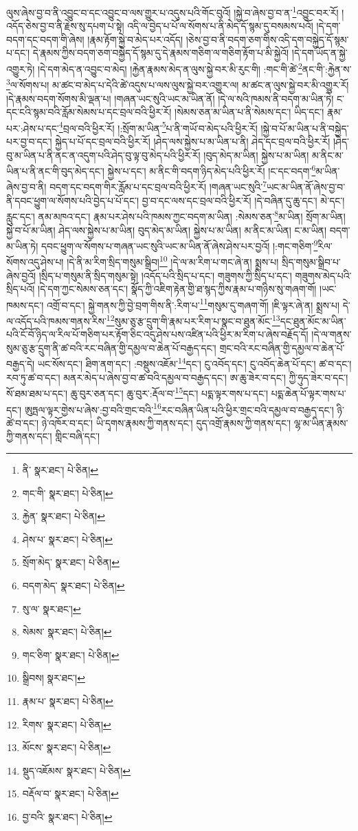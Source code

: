 ལུས་ཞེས་བྱ་བ་ནི་འབྱུང་བ་དང་འབྱུང་བ་ལས་གྱུར་པ་འདུས་པའི་གོང་བུའོ། །སྐྱེ་བ་ཞེས་བྱ་བ་ན་\footnote{ནི་  སྣར་ཐང་།  པེ་ཅིན། }འབྱུང་བར་རོ། །འདོད་ཅེས་བྱ་བ་ནི་རྗེས་སུ་དཔག་པ་སྟེ། འདི་ལ་བྱེད་པ་པོ་ལ་སོགས་པ་ནི་མེད་དོ་སྙམ་དུ་བསམས་པའོ། །དེ་དག་བདག་དང་བདག་གི་ཞེས། །རྣམ་རྟོག་སྐྱེ་བ་མེད་པར་འདོད། །ཅེས་བྱ་བ་ནི་བདག་ཅག་གིས་འདི་དག་བསྐྱེད་དོ་སྙམ་པ་དང་། དེ་རྣམས་ཀྱིས་བདག་ཅག་བསྐྱེད་དོ་སྙམ་དུ་དེ་རྣམས་གཅིག་ལ་གཅིག་རྟོག་པ་མི་སྐྱེའོ། །དེ་དག་ཡོད་ན་སྐྱེ་འགྱུར་ཏེ། །དེ་དག་མེད་ན་འབྱུང་བ་མེད། །རྐྱེན་རྣམས་མེད་ན་ལུས་སྐྱེ་བར་མི་རུང་གི། :གང་གི་ཚེ་\footnote{གང་གི་  སྣར་ཐང་།  པེ་ཅིན། }ནང་གི་:རྐྱེན་ས་\footnote{རྐྱེན་  སྣར་ཐང་།  པེ་ཅིན། }ལ་སོགས་པ། མ་ཚང་བ་མེད་པ་དེའི་ཚེ་འདུས་པ་ལས་ལུས་སྐྱེ་བར་འགྱུར་ལ། མ་ཚང་ན་ལུས་སྐྱེ་བར་མི་འགྱུར་རོ། །དེ་རྣམས་བདག་སོགས་མི་ལྡན་པ། །གཞན་ཡང་སུའི་ཡང་མ་ཡིན་ནོ། །དེ་ལ་སའི་ཁམས་ནི་བདག་མ་ཡིན་ཏེ། ང་དང་ངའི་སྙམ་བའི་རློམ་སེམས་པ་དང་བྲལ་བའི་ཕྱིར་རོ། །སེམས་ཅན་མ་ཡིན་པ་ནི་སེམས་དང་། ཡིད་དང་། རྣམ་པར་:ཤེས་པ་དང་\footnote{ཤེས་པ་  སྣར་ཐང་།  པེ་ཅིན། }བྲལ་བའི་ཕྱིར་རོ། །:སྲོག་མ་ཡིན་\footnote{སྲོག་མེད་  སྣར་ཐང་།  པེ་ཅིན། }པ་ནི་གཡོ་བ་མེད་པའི་ཕྱིར་རོ། །སྐྱེ་བ་པོ་མ་ཡིན་པ་ནི་བསྐྱེད་པར་བྱ་བ་དང་། སྐྱེད་པ་པོ་དང་བྲལ་བའི་ཕྱིར་རོ། །ཤེད་ལས་སྐྱེས་པ་མ་ཡིན་པ་ནི། ཤེད་དང་བྲལ་བའི་ཕྱིར་རོ། །ཤེད་བུ་མ་ཡིན་པ་ནི་ནང་ན་འདུག་པའི་ཤེད་བུ་ལྟ་བུ་མེད་པའི་ཕྱིར་རོ། །བུད་མེད་མ་ཡིན། སྐྱེས་པ་མ་ཡིན། མ་ནིང་མ་ཡིན་པ་ནི་ནང་གི་བུད་མེད་དང་། སྐྱེས་པ་དང་། མ་ནིང་གི་བདག་ཉིད་མེད་པའི་ཕྱིར་རོ། །ང་དང་བདག་\footnote{བདག་མེད་  སྣར་ཐང་།  པེ་ཅིན། }མ་ཡིན་ཞེས་བྱ་བ་ནི། བདག་དང་བདག་གིར་རློམ་པ་དང་བྲལ་བའི་ཕྱིར་རོ། །གཞན་ཡང་སུའི་\footnote{སུ་ལ་  སྣར་ཐང་། }ཡང་མ་ཡིན་ནོ་ཞེས་བྱ་བ་ནི་དབང་ཕྱུག་ལ་སོགས་པའི་བྱེད་པ་པོ་དང་། བྱ་བ་དང་ལས་དང་བྲལ་བའི་ཕྱིར་རོ། །དེ་བཞིན་དུ་ཆུ་དང་། མེ་དང་། རླུང་དང་། ནམ་མཁའ་དང་། རྣམ་པར་ཤེས་པའི་ཁམས་ཀྱང་བདག་མ་ཡིན། :སེམས་ཅན་\footnote{སེམས་  སྣར་ཐང་།  པེ་ཅིན། }མ་ཡིན། སྲོག་མ་ཡིན། སྐྱེ་བ་པོ་མ་ཡིན། ཤེད་ལས་སྐྱེས་པ་མ་ཡིན། བུད་མེད་མ་ཡིན། སྐྱེས་པ་མ་ཡིན། མ་ནིང་མ་ཡིན། ང་མ་ཡིན། བདག་མ་ཡིན་ཏེ། དབང་ཕྱུག་ལ་སོགས་པ་གཞན་ཡང་སུའི་ཡང་མ་ཡིན་ནོ་ཞེས་ཤེས་པར་བྱའོ། །:གང་གཅིག་\footnote{གང་ཅིག་  སྣར་ཐང་།  པེ་ཅིན། }རིལ་སོགས་འདུ་ཤེས་པ། །དེ་ནི་མ་རིག་སྲིད་གསུམ་སྒྲིབ།\footnote{སྒྲིབས།  སྣར་ཐང་། } །དེ་ལ་མ་རིག་པ་གང་ཞེ་ན། སྨྲས་པ། སྲིད་གསུམ་སྒྲིབ་པ་ཞེས་བྱའོ། །སྲིད་པ་གསུམ་ནི་སྲིད་གསུམ་སྟེ། །འདོད་པའི་སྲིད་པ་དང་། གཟུགས་ཀྱི་སྲིད་པ་དང་། གཟུགས་མེད་པའི་སྲིད་པའོ། །དེ་དག་ཀྱང་སེམས་ཅན་དང་། སྣོད་ཀྱི་འཇིག་རྟེན་གྱི་ཐ་སྙད་ཀྱིས་རྣམ་པ་གཉིས་སུ་གཞག་གོ། །ཡང་ཁམས་དང་། འགྲོ་བ་དང་། སྐྱེ་གནས་ཀྱི་བྱེ་བྲག་གིས་ནི་:རིག་པ་\footnote{རྣམ་པ་  སྣར་ཐང་།  པེ་ཅིན། }གསུམ་དུ་གཞག་གོ། །ཇི་ལྟར་ཞེ་ན། སྨྲས་པ། དེ་ལ་འདོད་པའི་ཁམས་གནས་རིས་\footnote{རིགས་  སྣར་ཐང་།  པེ་ཅིན། }སུམ་ཅུ་རྩ་དྲུག་གི་རྣམ་པར་རིག་པ་སྣང་བ་ཐུན་མོང་\footnote{མོངས་  སྣར་ཐང་།  པེ་ཅིན། }དང་ཐུན་མོང་མ་ཡིན་པའི་ངོ་བོ་ཉིད་ལ་རིལ་པོ་གཅིག་པར་རྟོག་ཅིང་འདུ་ཤེས་པས་འཛིན་པའི་ཕྱིར་མ་རིག་པ་ཞེས་བརྗོད་དོ། །དེ་ལ་གནས་སུམ་ཅུ་རྩ་དྲུག་ནི་ཚ་བའི་རང་བཞིན་གྱི་དམྱལ་བ་ཆེན་པོ་བརྒྱད་དང་། གྲང་བའི་རང་བཞིན་གྱི་དམྱལ་བ་ཆེན་པོ་བརྒྱད་དེ། ཡང་སོས་དང་། ཐིག་ནག་དང་། :བསྡུས་འཇོམ་\footnote{སྡུད་འཇོམས་  སྣར་ཐང་།  པེ་ཅིན། }དང་། ངུ་འབོད་དང་། ངུ་འབོད་ཆེན་པོ་དང་། ཚ་བ་དང་། རབ་ཏུ་ཚ་བ་དང་། མནར་མེད་པ་ཞེས་བྱ་བ་ཚ་བའི་དམྱལ་བ་བརྒྱད་དང་། ཨ་ཆུ་ཟེར་བ་དང་། ཀྱི་ཧུད་ཟེར་བ་དང་། སོ་ཐམ་ཐམ་པ་དང་། ཆུ་བུར་ཅན་དང་། ཆུ་བུར་:རྡོལ་བ་\footnote{བརྡོལ་བ་  སྣར་ཐང་།  པེ་ཅིན། }དང་། པདྨ་ལྟར་གས་པ་དང་། པདྨ་ཆེན་པོ་ལྟར་གས་པ་དང་། ཨུཏྤལ་ལྟར་གྱེས་པ་ཞེས་:བྱ་བའི་གྲང་བའི་\footnote{བྱ་བའི་  སྣར་ཐང་།  པེ་ཅིན། }རང་བཞིན་ཡིན་པའི་ཕྱིར་གྲང་བའི་དམྱལ་བ་བརྒྱད་དང་། ཉི་ཚེ་བ་དང་། ཉེ་འཁོར་བ་དང་། ཡི་དྭགས་རྣམས་ཀྱི་གནས་དང་། དུད་འགྲོ་རྣམས་ཀྱི་གནས་དང་། ལྷ་མ་ཡིན་རྣམས་ཀྱི་གནས་དང་། གླིང་བཞི་དང་། 
